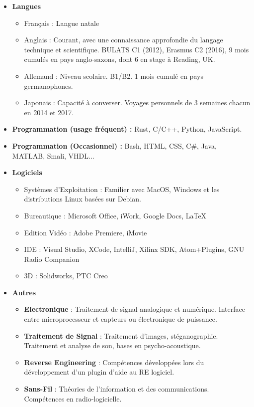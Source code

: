 \documentclass[11pt,a4paper,sans]{moderncv}        %
\begin{document}
\begin{itemize}

\item \textbf{Langues} 
\begin{itemize}
\item Français : Langue natale
\item Anglais : Courant, avec une connaissance approfondie du langage technique et scientifique. BULATS C1 (2012), Erasmus C2 (2016), 9 mois cumulés en pays anglo-saxons, dont 6 en stage à Reading, UK.
\item Allemand : Niveau scolaire. B1/B2. 1 mois cumulé en pays germanophones.
\item Japonais : Capacité à converser. Voyages personnels de 3 semaines chacun en 2014 et 2017.
\end{itemize}

\vspace{6pt}

\item \textbf{Programmation (usage fréquent) :} Rust, C/C++, Python, JavaScript.
\item \textbf{Programmation (Occasionnel) :} Bash, HTML, CSS, C\#, Java, MATLAB, Smali, VHDL...

\vspace{6pt}

\item \textbf{Logiciels}
\begin{itemize}
\item Systèmes d'Exploitation : Familier avec MacOS, Windows et les distributions Linux basées sur Debian.
\item Bureautique : Microsoft Office, iWork, Google Docs, \LaTeX
\item Edition Vidéo : Adobe Premiere, iMovie
\item IDE : Visual Studio, XCode, IntelliJ, Xilinx SDK, Atom+Plugins, GNU Radio Companion
\item 3D : Solidworks, PTC Creo
\end{itemize}

\vspace{6pt}

\item \textbf{Autres}
\begin{itemize}
\item \textbf{Electronique} : Traitement de signal analogique et numérique. Interface entre microprocesseur et capteurs ou électronique de puissance.
\item \textbf{Traitement de Signal} : Traitement d'images, stéganographie. Traitement et analyse de son, bases en psycho-acoustique.
\item \textbf{Reverse Engineering} : Compétences développées lors du développement d'un plugin d'aide au RE logiciel.
\item \textbf{Sans-Fil} : Théories de l'information et des communications. Compétences en radio-logicielle.
\end{itemize}


\end{itemize}
\end{document}
